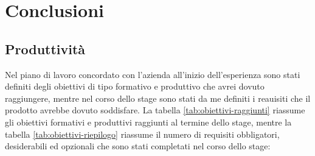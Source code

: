 
\chapter{Conclusioni}
\label{cap:conclusioni}

\intro{}

\section{Produttività}
Nel piano di lavoro concordato con l'azienda all'inizio dell'esperienza sono stati definiti degli obiettivi di tipo formativo e produttivo che avrei dovuto raggiungere, mentre nel corso dello stage sono stati da me definiti i reauisiti che il prodotto avrebbe dovuto soddisfare. La tabella \ref{tab:obiettivi-raggiunti} riassume gli obiettivi formativi e produttivi raggiunti al termine dello stage, mentre la tabella \ref{tab:obiettivi-riepilogo} riassume il numero di requisiti obbligatori, desiderabili ed opzionali che sono stati completati nel corso dello stage:\\

